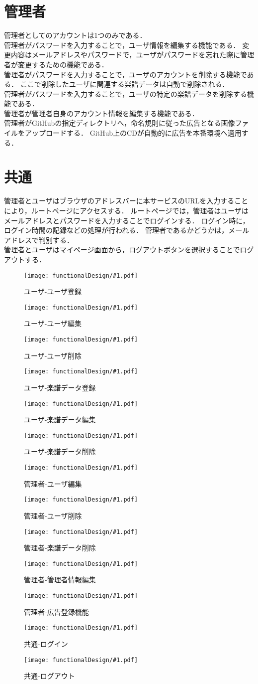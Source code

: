 \section{管理者}
管理者としてのアカウントは1つのみである．\\
管理者がパスワードを入力することで，ユーザ情報を編集する機能である．
変更内容はメールアドレスやパスワードで，ユーザがパスワードを忘れた際に管理者が変更するための機能である．\\
管理者がパスワードを入力することで，ユーザのアカウントを削除する機能である．
ここで削除したユーザに関連する楽譜データは自動で削除される．\\
管理者がパスワードを入力することで，ユーザの特定の楽譜データを削除する機能である．\\
管理者が管理者自身のアカウント情報を編集する機能である．\\
管理者がGitHubの指定ディレクトリへ，命名規則に従った広告となる画像ファイルをアップロードする．
GitHub上のCDが自動的に広告を本番環境へ適用する．
\section{共通}
管理者とユーザはブラウザのアドレスバーに本サービスのURLを入力することにより，ルートページにアクセスする．
ルートページでは，管理者はユーザはメールアドレスとパスワードを入力することでログインする．
ログイン時に，ログイン時間の記録などの処理が行われる．
管理者であるかどうかは，メールアドレスで判別する．\\
管理者とユーザはマイページ画面から，ログアウトボタンを選択することでログアウトする．
\newcommand{\icd}[2]{\begin{figure}[p]\centering\texttt{[image: functionalDesign/\#1.pdf]}\caption{#2}\label{#2}\end{figure}}
\icd{211-機能設計-利用者側-ユーザ登録}{ユーザ-ユーザ登録}
\icd{212-機能設計-利用者側-ユーザ編集}{ユーザ-ユーザ編集}
\icd{213-機能設計-利用者側-ユーザ削除}{ユーザ-ユーザ削除}
\icd{214-機能設計-利用者側-楽譜データ登録}{ユーザ-楽譜データ登録}
\icd{215-機能設計-利用者側-楽譜データ編集}{ユーザ-楽譜データ編集}
\icd{216-機能設計-利用者側-楽譜データ削除}{ユーザ-楽譜データ削除}
\icd{221-機能設計-管理者側-ユーザ編集}{管理者-ユーザ編集}
\icd{222-機能設計-管理者側-ユーザ削除}{管理者-ユーザ削除}
\icd{223-機能設計-管理者側-楽譜データ削除}{管理者-楽譜データ削除}
\icd{224-機能設計-管理者側-管理者情報編集機能}{管理者-管理者情報編集}
\icd{225-機能設計-管理者側-広告登録機能}{管理者-広告登録機能}
\icd{217-機能設計-利用者側-ログイン}{共通-ログイン}
\icd{218-機能設計-利用者側-ログアウト}{共通-ログアウト}
